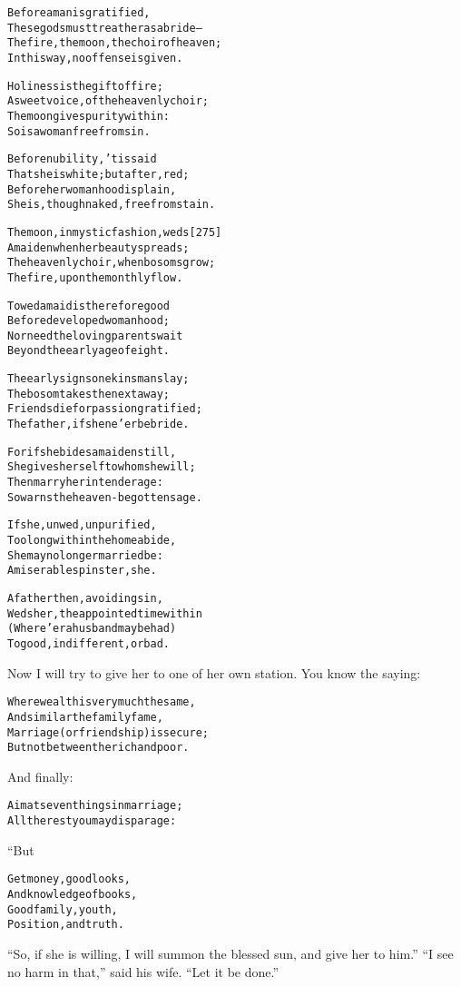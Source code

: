 \documentclass{article}
\renewenvironment{verbatim}{\begin{alltt}\normalfont\begin{centering}}{\end{centering}\end{alltt}}
\begin{document}
\begin{verbatim}
Before a man is gratified,
These gods must treat her as a bride--
The fire, the moon, the choir of heaven;
In this way, no offense is given.

Holiness is the gift of fire;
A sweet voice, of the heavenly choir;
The moon gives purity within:
So is a woman free from sin.

Before nubility, 'tis said
That she is white; but after, red;
Before her womanhood is plain,
She is, though naked, free from stain.

The moon, in mystic fashion, weds                       [275]
A maiden when her beauty spreads;
The heavenly choir, when bosoms grow;
The fire, upon the monthly flow.

To wed a maid is therefore good
Before developed womanhood;
Nor need the loving parents wait
Beyond the early age of eight.

The early signs one kinsman slay;
The bosom takes the next away;
Friends die for passion gratified;
The father, if she ne'er be bride.

For if she bides a maiden still,
She gives herself to whom she will;
Then marry her in tender age:
So warns the heaven-begotten sage.

If she, unwed, unpurified,
Too long within the home abide,
She may no longer married be:
A miserable spinster, she.

A father then, avoiding sin,
Weds her, the appointed time within
(Where'er a husband may be had)
To good, indifferent, or bad.
\end{verbatim}
Now I will try to give her to one of her own station. You know the
saying:

\begin{verbatim}
Where wealth is very much the same,
And similar the family fame,
Marriage (or friendship) is secure;
But not between the rich and poor.
\end{verbatim}
And finally:

\begin{verbatim}
Aim at seven things in marriage;
All the rest you may disparage:
\end{verbatim}
“But

\begin{verbatim}
Get money, good looks,
And knowledge of books,
Good family, youth,
Position, and truth.
\end{verbatim}
``So, if she is willing, I will summon the blessed sun, and give her to him.''
``I see no harm in that,'' said his wife. ``Let it be done.''
\end{document}

